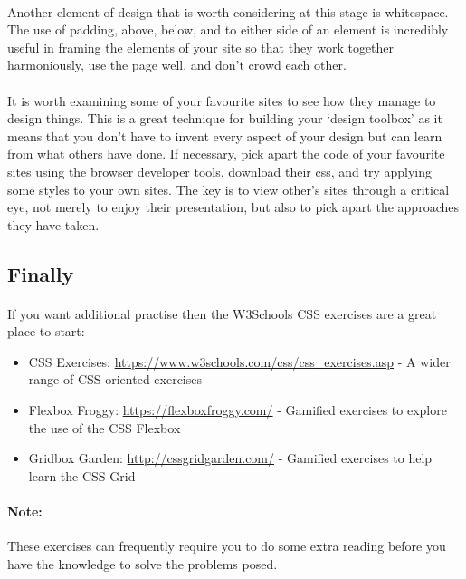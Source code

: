 \documentclass[10pt, a4paper, twosize]{article}
\begin{document}
\paragraph{} Another element of design that is worth considering at this stage is whitespace. The use of padding, above, below, and to either side of an element is incredibly useful in framing the elements of your site so that they work together harmoniously, use the page well, and don't crowd each other.

\paragraph{} It is worth examining some of your favourite sites to see how they manage to design things. This is a great technique for building your `design toolbox' as it means that you don't have to invent every aspect of your design but can learn from what others have done. If necessary, pick apart the code of your favourite sites using the browser developer tools, download their css, and try applying some styles to your own sites. The key is to view other's sites through a critical eye, not merely to enjoy their presentation, but also to pick apart the approaches they have taken. 

\subsection{Finally}
\paragraph{} If you want additional practise then the W3Schools CSS exercises are a great place to start:
\begin{itemize}
\item CSS Exercises: \url{https://www.w3schools.com/css/css_exercises.asp} - A wider range of CSS oriented exercises
\item Flexbox Froggy: \url{https://flexboxfroggy.com/} - Gamified exercises to explore the use of the CSS Flexbox
\item Gridbox Garden: \url{http://cssgridgarden.com/} - Gamified exercises to help learn the CSS Grid
\end{itemize}

\paragraph{Note:} These exercises can frequently require you to do some extra reading before you have the knowledge to solve the problems posed.
\end{document}
